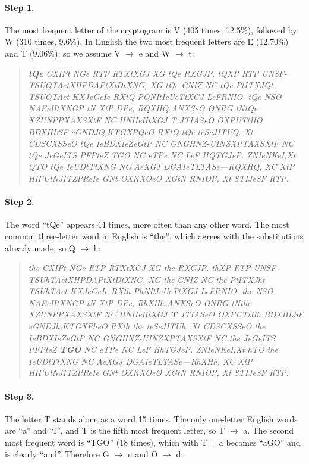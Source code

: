 \documentclass[12pt,a4paper]{article}
\newenvironment{cryptotext}{\begin{quote}\raggedright\itshape\small}{\end{quote}}
\begin{document}
\paragraph{Step 1.} The most frequent letter of the cryptogram is V (405 times, 12.5\%),
followed by W (310 times, 9.6\%). In English the two most frequent letters are E (12.70\%)
and T (9.06\%), so we assume V $\rightarrow$ e and W $\rightarrow$ t:

\begin{cryptotext}
\textbf{tQe} CXIPt NGe RTP RTXtXGJ XG tQe RXGJP. tQXP RTP UNSF-TSUQTAetXHPDAPtXtDtXNG, XG tQe CNIZ NC tQe PtITXJQt-TSUQTAet KXJeGeIe RXtQ PQNItIeUeTtXGJ LeFRNIO. tQe NSO NAEeHtXNGP tN XtP DPe, RQXHQ ANXSeO ONRG tNtQe XZUNPPXAXSXtF NC HNIIeHtXGJ T JTIASeO OXPUTtHQ BDXHLSF eGNDJQ,KTGXPQeO RXtQ tQe teSeJITUQ. Xt CDSCXSSeO tQe IeBDXIeZeGtP NC GNGHNZ-UINZXPTAXSXtF NC tQe JeGeITS PFPteZ TGO NC eTPe NC LeF HQTGJeP. ZNIeNKeI,Xt QTO tQe IeUDtTtXNG NC AeXGJ DGAIeTLTASe---RQXHQ, XC XtP HIFUtNJITZPReIe GNt OXKXOeO XGtN RNIOP, Xt STIJeSF RTP.
\end{cryptotext}

\paragraph{Step 2.} The word ``tQe'' appears 44 times, more often than any other word. The
most common three-letter word in English is ``the'', which agrees with the substitutions
already made, so Q $\rightarrow$ h:

\begin{cryptotext}
the CXIPt NGe RTP RTXtXGJ XG the RXGJP. thXP RTP UNSF-TSUhTAetXHPDAPtXtDtXNG, XG the CNIZ NC the PtITXJht-TSUhTAet KXJeGeIe RXth PhNItIeUeTtXGJ LeFRNIO. the NSO NAEeHtXNGP tN XtP DPe, RhXHh ANXSeO ONRG tNthe XZUNPPXAXSXtF NC HNIIeHtXGJ \textbf{T} JTIASeO OXPUTtHh BDXHLSF eGNDJh,KTGXPheO RXth the teSeJITUh. Xt CDSCXSSeO the IeBDXIeZeGtP NC GNGHNZ-UINZXPTAXSXtF NC the JeGeITS PFPteZ \textbf{TGO} NC eTPe NC LeF HhTGJeP. ZNIeNKeI,Xt hTO the IeUDtTtXNG NC AeXGJ DGAIeTLTASe---RhXHh, XC XtP HIFUtNJITZPReIe GNt OXKXOeO XGtN RNIOP, Xt STIJeSF RTP.
\end{cryptotext}

\paragraph{Step 3.} The letter T stands alone as a word 15 times. The only one-letter
English words are ``a'' and ``I'', and T is the fifth most frequent letter, so
T $\rightarrow$ a. The second most frequent word is ``TGO'' (18 times), which with T = a
becomes ``aGO'' and is clearly ``and''. Therefore G $\rightarrow$ n and O $\rightarrow$ d:
\end{document}
